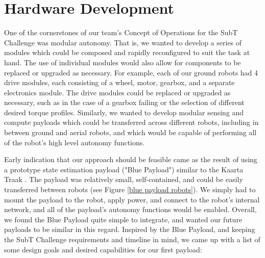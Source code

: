\chapter{Hardware Development}

One of the cornerstones of our team's Concept of Operations for the SubT Challenge was modular autonomy. That is, we wanted to develop a series of modules which could be composed and rapidly reconfigured to suit the task at hand. The use of individual modules would also allow for components to be replaced or upgraded as necessary. For example, each of our ground robots had 4 drive modules, each consisting of a wheel, motor, gearbox, and a separate electronics module. The drive modules could be replaced or upgraded as necessary, such as in the case of a gearbox failing or the selection of different desired torque profiles. Similarly, we wanted to develop modular sensing and compute payloads which could be transferred across different robots, including in between ground and aerial robots, and which would be capable of performing all of the robot's high level autonomy functions.

Early indication that our approach should be feasible came as the result of using a prototype state estimation payload ("Blue Payload") similar to the Kaarta Traak \cite{kaarta_traak}. The payload was relatively small, self-contained, and could be easily transferred between robots (see Figure \ref{blue payload robots}). We simply had to mount the payload to the robot, apply power, and connect to the robot's internal network, and all of the payload's autonomy functions would be enabled. Overall, we found the Blue Payload quite simple to integrate, and wanted our future payloads to be similar in this regard. Inspired by the Blue Payload, and keeping the SubT Challenge requirements and timeline in mind, we came up with a list of some design goals and desired capabilities for our first payload:

